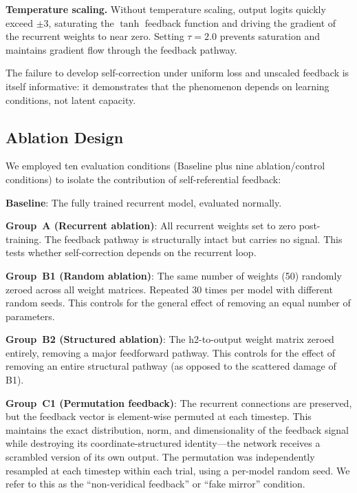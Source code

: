 \documentclass[10pt]{article}
\begin{document}
\textbf{Temperature scaling.} Without temperature scaling, output logits quickly exceed $\pm 3$, saturating the $\tanh$ feedback function and driving the gradient of the recurrent weights to near zero. Setting $\tau = 2.0$ prevents saturation and maintains gradient flow through the feedback pathway.

The failure to develop self-correction under uniform loss and unscaled feedback is itself informative: it demonstrates that the phenomenon depends on learning conditions, not latent capacity.

\subsection{Ablation Design}

We employed ten evaluation conditions (Baseline plus nine ablation/control conditions) to isolate the contribution of self-referential feedback:

\textbf{Baseline}: The fully trained recurrent model, evaluated normally.

\textbf{Group~A (Recurrent ablation)}: All recurrent weights set to zero post-training. The feedback pathway is structurally intact but carries no signal. This tests whether self-correction depends on the recurrent loop.

\textbf{Group~B1 (Random ablation)}: The same number of weights (50) randomly zeroed across all weight matrices. Repeated 30 times per model with different random seeds. This controls for the general effect of removing an equal number of parameters.

\textbf{Group~B2 (Structured ablation)}: The h2-to-output weight matrix zeroed entirely, removing a major feedforward pathway. This controls for the effect of removing an entire structural pathway (as opposed to the scattered damage of B1).

\textbf{Group~C1 (Permutation feedback)}: The recurrent connections are preserved, but the feedback vector is element-wise permuted at each timestep. This maintains the exact distribution, norm, and dimensionality of the feedback signal while destroying its coordinate-structured identity---the network receives a scrambled version of its own output. The permutation was independently resampled at each timestep within each trial, using a per-model random seed. We refer to this as the ``non-veridical feedback'' or ``fake mirror'' condition.
\end{document}
